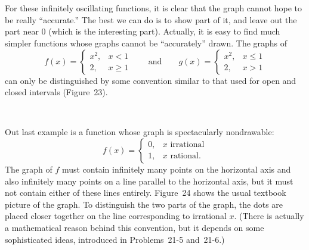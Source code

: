 \begin{center}
\\[0.6em]
\end{center}
\begin{center}
\\[0.6em]
\end{center}

For these infinitely oscillating functions, it is clear that the graph cannot
hope to be really ``accurate.'' The best we can do is to show part of it, and
leave out the part near $0$ (which is the interesting part). Actually, it is
easy to find much simpler functions whose graphs cannot be ``accurately''
drawn. The graphs of
\[
f(x)=\begin{cases} x^2, & x<1\\ 2, & x\geq 1\end{cases}
\qquad\text{and}\qquad
g(x)=\begin{cases} x^2, & x\leq 1\\ 2, & x>1\end{cases}
\]
can only be distinguished by some convention similar to that used for open and
closed intervals (Figure~23).

\begin{center}
\\[0.6em]
\end{center}

Out last example is a function whose graph is spectacularly nondrawable:
\[
f(x)=\begin{cases} 0, & x\text{ irrational}\\ 1, & x\text{ rational.}\end{cases}
\]
The graph of $f$ must contain infinitely many points on the horizontal axis and
also infinitely many points on a line parallel to the horizontal axis, but it
must not contain either of these lines entirely. Figure~24 shows the usual
textbook picture of the graph. To distinguish the two parts of the graph, the
dots are placed closer together on the line corresponding to irrational $x$.
(There is actually a mathematical reason behind this convention, but it depends
on some sophisticated ideas, introduced in Problems~21-5 and~21-6.)

\begin{center}
\\[0.6em]
\end{center}

